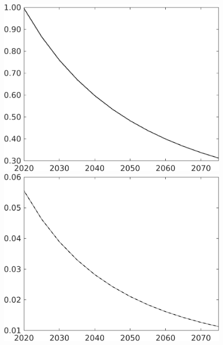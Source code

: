 \documentclass[12pt]{article}
\begin{document}
\begin{figure}[h!!]
\begin{minipage}[]{0.32\textwidth}
	\end{minipage}	
	\begin{minipage}[]{0.32\textwidth}
		\includegraphics[width=1\textwidth]{../../codding_model/own_basedOnFried/optimalPol_010922_revision/figures/all_13Sept22/CompTaul_Equlab_LFBAU_Reg0_pg_spillover0_nsk0_xgr0_knspil1_sep1_countec0_GovRev0_etaa0.79_lgd0.png}
	\end{minipage}		
	\begin{minipage}[]{0.32\textwidth}
		\includegraphics[width=1\textwidth]{../../codding_model/own_basedOnFried/optimalPol_010922_revision/figures/all_13Sept22/CompTaul_Equlab_LFBAU_Reg0_pepn_spillover0_nsk0_xgr0_knspil1_sep1_countec0_GovRev0_etaa0.79_lgd0.png}

\end{minipage}
\end{figure}
\end{document}
